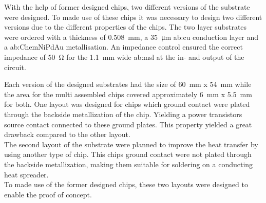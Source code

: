 With the help of former designed chips, two different versions of the substrate were designed.
To made use of these chips it was necessary to design two different versions due to the different properties of the chips.
The two layer substrates were ordered with a thickness of \SI{0.508}{\milli \metre}, a \SI{35}{\micro \metre} \gls{ab:cu} conduction layer and a \gls{ab:ChemNiPdAu} metallisation.
An impedance control ensured the correct impedance of \SI{50}{\ohm} for the \SI{1.1}{\milli \meter} wide \gls{ab:msl} at the in- and output of the circuit.


Each version of the designed substrates had the size of \SI{60}{\milli \meter} x \SI{54}{\milli \meter} while the area for the multi assembled chips covered approximately \SI{6}{\milli \meter} x \SI{5.5}{\milli \meter} for both.
One layout was designed for chips which ground contact were plated through the backside metallization of the chip.
Yielding a power transistors source contact connected to these ground plates.
This property yielded a great drawback compared to the other layout.\\
The second layout of the substrate were planned to improve the heat transfer by using another type of chip.
This chips ground contact were not plated through the backside metallization, making them suitable for soldering on a conducting heat spreader.\\
To made use of the former designed chips, these two layouts were designed to enable the proof of concept.


